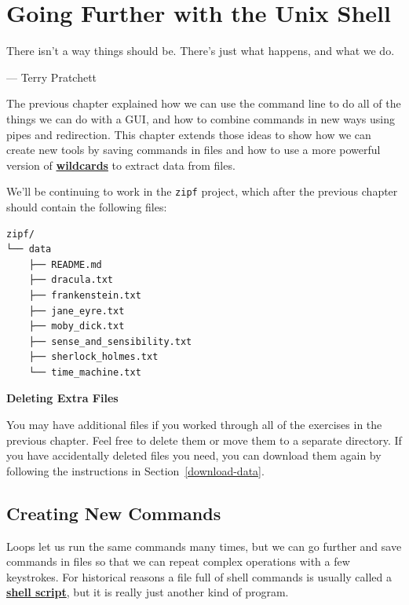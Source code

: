 \documentclass[
]{krantz}
\renewenvironment{quote}{\begin{VF}}{\end{VF}}
\newcommand{\gref}[2]{\hyperlink{#2}{\textbf{#1}}}
\begin{document}
\hypertarget{bash-advanced}{%
\chapter{Going Further with the Unix Shell}\label{bash-advanced}}

\begin{quote}
There isn't a way things should be. There's just what happens, and what we do.

--- Terry Pratchett
\end{quote}

The previous chapter explained how we can use the command line
to do all of the things we can do with a GUI,
and how to combine commands in new ways using pipes and redirection.
This chapter extends those ideas to show
how we can create new tools by saving commands in files
and how to use a more powerful version of \gref{wildcards}{wildcard}
to extract data from files.

We'll be continuing to work in the \texttt{zipf} project,
which after the previous chapter should contain the following files:

\begin{verbatim}
zipf/
└── data
    ├── README.md
    ├── dracula.txt
    ├── frankenstein.txt
    ├── jane_eyre.txt
    ├── moby_dick.txt
    ├── sense_and_sensibility.txt
    ├── sherlock_holmes.txt
    └── time_machine.txt
\end{verbatim}

\begin{quote}
\textbf{Deleting Extra Files}

You may have additional files
if you worked through all of the exercises in the previous chapter.
Feel free to delete them or move them to a separate directory.
If you have accidentally deleted files you need,
you can download them again by following the instructions in Section~\ref{download-data}.
\end{quote}

\hypertarget{bash-advanced-script}{%
\section{Creating New Commands}\label{bash-advanced-script}}

Loops let us run the same commands many times,
but we can go further and save commands in files
so that we can repeat complex operations with a few keystrokes.
For historical reasons
a file full of shell commands is usually called a \gref{shell script}{shell\_script},
but it is really just another kind of program.
\end{document}
